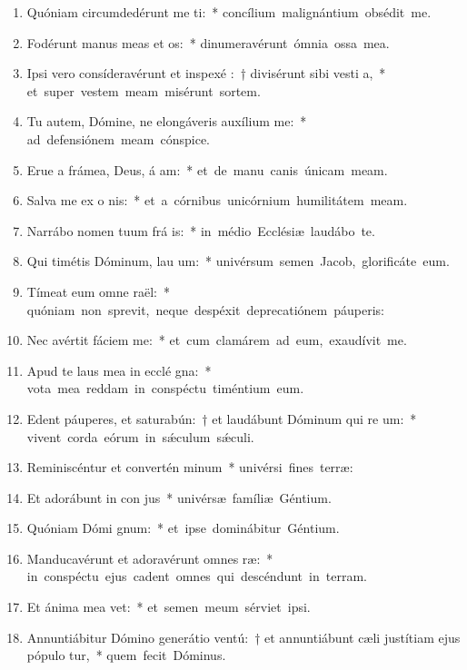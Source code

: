 \begin{flushleft}
\begin{enumerate}[leftmargin=*]
\item Quóniam circumdedérunt me  ti:~* \mbox{concílium malignántium obsédit me.}
\item Fodérunt manus meas et  os:~* \mbox{dinumeravérunt ómnia ossa mea.}
\item Ipsi vero consíderavérunt et inspexé :~† divisérunt sibi vesti a,~* \mbox{et super vestem meam misérunt sortem.}
\item Tu autem, Dómine, ne elongáveris auxílium   me:~* \mbox{ad defensiónem meam cónspice.}
\item Erue a frámea, Deus, á am:~* \mbox{et de manu canis únicam meam.}
\item Salva me ex o nis:~* \mbox{et a córnibus unicórnium humilitátem meam.}
\item Narrábo nomen tuum frá is:~* \mbox{in médio Ecclésiæ laudábo te.}
\item Qui timétis Dóminum, lau um:~* \mbox{univérsum semen Jacob, glorificáte eum.}
\item Tímeat eum omne  raël:~* \mbox{quóniam non sprevit, neque despéxit deprecatiónem páuperis:}
\item Nec avértit fáciem   me:~* \mbox{et cum clamárem ad eum, exaudívit me.}
\item Apud te laus mea in ecclé gna:~* \mbox{vota mea reddam in conspéctu timéntium eum.}
\item Edent páuperes, et saturabún:~† et laudábunt Dóminum qui re um:~* \mbox{vivent corda eórum in s\'{\ae}culum s\'{\ae}culi.}
\item Reminiscéntur et convertén  minum~* \mbox{univérsi fines terræ:}
\item Et adorábunt in con jus~* \mbox{univérsæ famíliæ Géntium.}
\item Quóniam Dómi  gnum:~* \mbox{et ipse dominábitur Géntium.}
\item Manducavérunt et adoravérunt omnes  ræ:~* \mbox{in conspéctu ejus cadent omnes qui descéndunt in terram.}
\item Et ánima mea  vet:~* \mbox{et semen meum sérviet ipsi.}
\item Annuntiábitur Dómino generátio ventú:~† et annuntiábunt cæli justítiam ejus pópulo  tur,~* \mbox{quem fecit Dóminus.}


\end{enumerate}
\end{flushleft}

